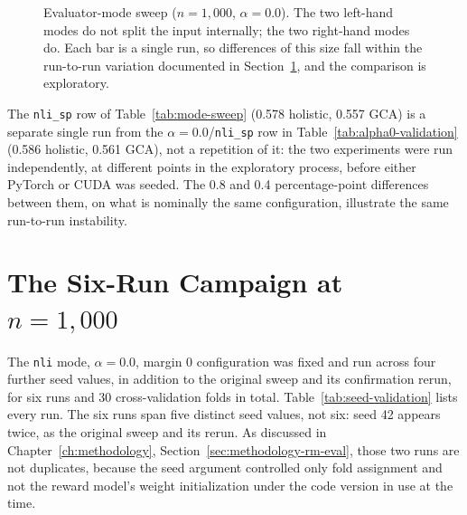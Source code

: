 \begin{figure}[htbp]
\centering
{}
\caption[Evaluator-mode sweep]{Evaluator-mode sweep ($n=1{,}000$, $\alpha=0.0$). The two left-hand
modes do not split the input internally; the two right-hand modes do. Each bar is
a single run, so differences of this size fall within the run-to-run variation
documented in Section~\ref{sec:results-final-campaign}, and the comparison is
exploratory.}
\label{fig:mode-sweep}
\end{figure}

The \texttt{nli\_sp} row of Table~\ref{tab:mode-sweep} (0.578 holistic, 0.557
GCA) is a separate single run from the $\alpha=0.0$/\texttt{nli\_sp} row in
Table~\ref{tab:alpha0-validation} (0.586 holistic, 0.561 GCA), not a
repetition of it: the two experiments were run independently, at different
points in the exploratory process, before either PyTorch or CUDA was seeded.
The 0.8 and 0.4 percentage-point differences between them, on what is
nominally the same configuration, illustrate the same run-to-run instability.

\section{The Six-Run Campaign at \texorpdfstring{$n=1{,}000$}{n=1,000}}
\label{sec:results-final-campaign}

The \texttt{nli} mode, $\alpha=0.0$, margin 0 configuration was fixed and run
across four further seed values, in addition to the original sweep and its
confirmation rerun, for six runs and 30 cross-validation folds in total.
Table~\ref{tab:seed-validation} lists every run. The six runs span five
distinct seed values, not six: seed 42 appears twice, as the original sweep and
its rerun. As discussed in Chapter~\ref{ch:methodology},
Section~\ref{sec:methodology-rm-eval}, those two runs are not duplicates, because
the seed argument controlled only fold assignment and not the reward model's weight
initialization under the code version in use at the time.

